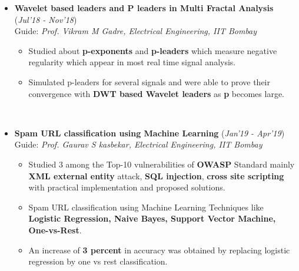 \documentclass[10pt]{article}
\begin{document}
\begin{itemize}[leftmargin=0.4cm]
\item \textbf{Wavelet based leaders and P leaders in Multi
Fractal Analysis}
\hfill{(\textit{Jul'18 - Nov'18})}\\
Guide: \textit{Prof. Vikram M Gadre, Electrical Engineering, IIT Bombay}\\\vspace{-0.68cm}
    \begin{itemize}
    \item Studied about \textbf{p-exponents} and \textbf{p-leaders} which measure negative regularity which appear in most real time signal analysis.\vspace{-0.1cm}
    \item Simulated p-leaders for several signals and were able to prove their convergence with \textbf{DWT based Wavelet leaders} as \textbf{p} becomes large.
\vspace{-0.1cm}

    \end{itemize}\
    \vspace{-0.75cm}

\item \textbf{Spam URL classification using Machine Learning}
\hfill{(\textit{Jan'19 - Apr'19})}\\
Guide: \textit{Prof. Gaurav S kasbekar, Electrical Engineering, IIT Bombay}\\
\vspace{-0.7cm}
    \begin{itemize}
    \item Studied 3 among the Top-10 vulnerabilities of \textbf{OWASP} Standard mainly \textbf{XML external entity} attack, \textbf{SQL injection}, \textbf{cross site scripting} with practical implementation and proposed solutions.\vspace{-0.1cm}
    \item Spam URL classification using Machine Learning Techniques like \textbf{Logistic Regression, Naive Bayes, Support Vector Machine, One-vs-Rest}.
    \item An increase of \textbf{3 percent} in accuracy was obtained by replacing logistic regression by one vs rest classification.\vspace{-0.1cm}
    \end{itemize}

    \vspace{0.1cm}


\end{itemize}
\hspace{-0.17cm}\colorbox{bl}{}%
    \vspace{0.1cm}
\end{document}
